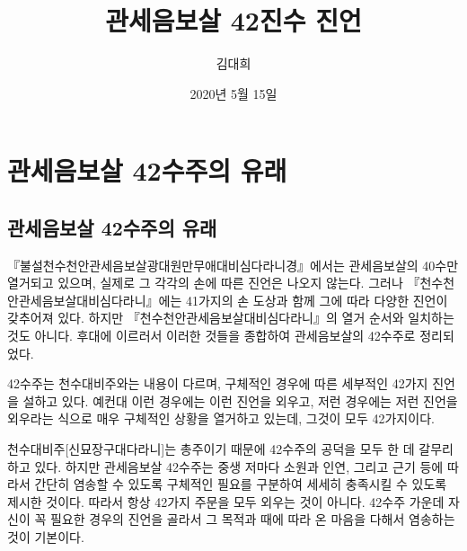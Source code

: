 \documentclass[12pt, a4paper, oneside]{book}
\let\stdsection\section
\renewcommand\section{\newpage\stdsection}
\begin{document}
	
			\dominitoc
			

			\title{ 관세음보살 42진수 진언 }
			\author{ 김대희}
			\date{2020년  5월 15일}
			\maketitle


			\tableofcontents






	\chapter{관세음보살 42수주의 유래}


		\newpage
		\minitoc				%




\section{ 관세음보살 42수주의 유래 }


 『불설천수천안관세음보살광대원만무애대비심다라니경』에서는 관세음보살의 40수만 열거되고 있으며,  실제로 그 각각의 손에 따른 진언은 나오지 않는다.
 그러나 『천수천안관세음보살대비심다라니』에는 41가지의 손 도상과 함께 그에 따라 다양한 진언이 갖추어져 있다.
 하지만 『천수천안관세음보살대비심다라니』​의 열거 순서와 일치하는 것도 아니다.
 후대에 이르러서 이러한 것들을 종합하여 관세음보살의 42수주로 정리되었다.


 42수주는 천수대비주와는 내용이 다르며, 구체적인 경우에 따른 세부적인 42가지 진언을 설하고 있다.
 예컨대 이런 경우에는 이런 진언을 외우고, 저런 경우에는 저런 진언을 외우라는 식으로 매우 구체적인 상황을 열거하고 있는데, 그것이 모두 42가지이다.

 천수대비주[신묘장구대다라니]는 총주이기 때문에 42수주의 공덕을 모두 한 데 갈무리 하고 있다.
 하지만 관세음보살 42수주는 중생 저마다 소원과 인연, 그리고 근기 등에 따라서 간단히 염송할 수 있도록 구체적인 필요를 구분하여 세세히 충족시킬 수 있도록 제시한 것이다.
 따라서 항상 42가지 주문을 모두 외우는 것이 아니다. 
 42수주 가운데 자신이 꼭 필요한 경우의 진언을 골라서 그 목적과 때에 따라 온 마음을 다해서 염송하는 것이 기본이다.
\end{document}
